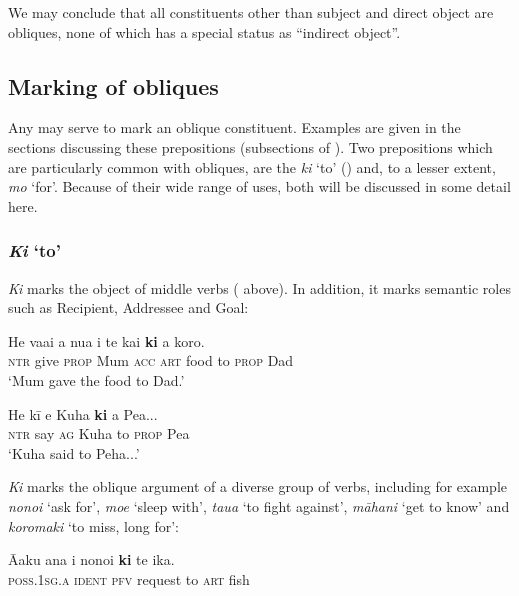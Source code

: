 We may conclude that all constituents other than subject and direct object are obliques, none of which has a special status as “indirect object”.
\subsection{Marking of obliques}\label{sec:8.8.2}

Any  may serve to mark an oblique constituent. Examples are given in the sections discussing these prepositions (subsections of ). Two prepositions which are particularly common with obliques, are the   \textit{ki} ‘to’ () and, to a lesser extent, \textit{mo} ‘for’. Because of their wide range of uses, both will be discussed in some detail here.

\subsubsection{\textit{Ki} ‘to’}
\textit{Ki} marks the object of middle verbs ( above). In addition, it marks semantic roles such as Recipient, Addressee and Goal:

\ea\label{ex:8.173}
\gll He va{\ꞌ}ai a nua i te kai \textbf{ki} a koro. \\
\textsc{ntr} give \textsc{prop} Mum \textsc{acc} \textsc{art} food to \textsc{prop} Dad \\

\glt 
‘Mum gave the food to Dad.’ \textstyleExampleref{[R236.078]} 
\z

\ea\label{ex:8.174}
\gll He kī e Kuha \textbf{ki} a Pea... \\
\textsc{ntr} say \textsc{ag} Kuha to \textsc{prop} Pea \\

\glt
‘Kuha said to Peha...’ \textstyleExampleref{[R229.034]} 
\z

\textit{Ki} marks the oblique argument of a diverse group of verbs, including for example \textit{\mbox{nono{\ꞌ}i}} ‘ask for’, \textit{moe} ‘sleep with’, \textit{tau{\ꞌ}a} ‘to fight against’, \textit{māhani} ‘get to know’ and \textit{koromaki} ‘to miss, long for’:

\ea\label{ex:8.175}
\gll {\ꞌ}Ā{\ꞌ}aku {\ꞌ}ana i nono{\ꞌ}i \textbf{ki} te ika. \\
\textsc{poss.1sg.a} \textsc{ident} \textsc{pfv} request to \textsc{art} fish \\

